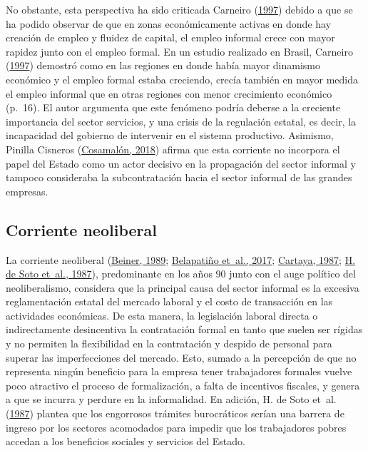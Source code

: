 \documentclass[
  letterpaper,
  12pt,
  oneside,
  spanish,
  doublespacing,
  headsepline,
  parskip]{MastersDoctoralThesis}
\begin{document}
No obstante, esta perspectiva ha sido criticada Carneiro
(\protect\hyperlink{ref-carneiro1997}{1997}) debido a que se ha podido
observar de que en zonas económicamente activas en donde hay creación de
empleo y fluidez de capital, el empleo informal crece con mayor rapidez
junto con el empleo formal. En un estudio realizado en Brasil, Carneiro
(\protect\hyperlink{ref-carneiro1997}{1997}) demostró como en las
regiones en donde había mayor dinamismo económico y el empleo formal
estaba creciendo, crecía también en mayor medida el empleo informal que
en otras regiones con menor crecimiento económico (p.~16). El autor
argumenta que este fenómeno podría deberse a la creciente importancia
del sector servicios, y una crisis de la regulación estatal, es decir,
la incapacidad del gobierno de intervenir en el sistema productivo.
Asimismo, Pinilla Cisneros
(\protect\hyperlink{ref-cosamaluxf3n2018}{Cosamalón, 2018}) afirma que
esta corriente no incorpora el papel del Estado como un actor decisivo
en la propagación del sector informal y tampoco consideraba la
subcontratación hacia el sector informal de las grandes empresas.

\hypertarget{corriente-neoliberal}{%
\subsection{Corriente neoliberal}\label{corriente-neoliberal}}

La corriente neoliberal (\protect\hyperlink{ref-beiner1989}{Beiner,
1989}; \protect\hyperlink{ref-belapatiuxf1o2017}{Belapatiño et~al.,
2017}; \protect\hyperlink{ref-cartaya1987}{Cartaya, 1987};
\protect\hyperlink{ref-desoto1987}{H. de Soto et~al., 1987}),
predominante en los años 90 junto con el auge político del
neoliberalismo, considera que la principal causa del sector informal es
la excesiva reglamentación estatal del mercado laboral y el costo de
transacción en las actividades económicas. De esta manera, la
legislación laboral directa o indirectamente desincentiva la
contratación formal en tanto que suelen ser rígidas y no permiten la
flexibilidad en la contratación y despido de personal para superar las
imperfecciones del mercado. Esto, sumado a la percepción de que no
representa ningún beneficio para la empresa tener trabajadores formales
vuelve poco atractivo el proceso de formalización, a falta de incentivos
fiscales, y genera a que se incurra y perdure en la informalidad. En
adición, H. de Soto et~al. (\protect\hyperlink{ref-desoto1987}{1987})
plantea que los engorrosos trámites burocráticos serían una barrera de
ingreso por los sectores acomodados para impedir que los trabajadores
pobres accedan a los beneficios sociales y servicios del Estado.
\end{document}
